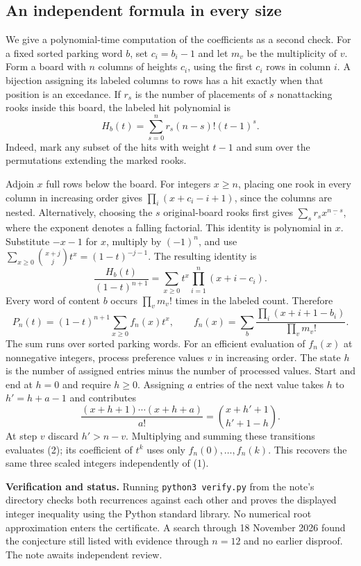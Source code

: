 \documentclass[11pt]{article}
\begin{document}
\subsection*{An independent formula in every size}
We give a polynomial-time computation of the coefficients as a second check. For a fixed sorted parking word $b$, set $c_i=b_i-1$ and let $m_v$ be the multiplicity of $v$. Form a board with $n$ columns of heights $c_i$, using the first $c_i$ rows in column $i$. A bijection assigning its labeled columns to rows has a hit exactly when that position is an excedance. If $r_s$ is the number of placements of $s$ nonattacking rooks inside this board, the labeled hit polynomial is
\[
 H_b(t)=\sum_{s=0}^n r_s(n-s)!(t-1)^s .
\]
Indeed, mark any subset of the hits with weight $t-1$ and sum over the permutations extending the marked rooks.

Adjoin $x$ full rows below the board. For integers $x\ge n$, placing one rook in every column in increasing order gives $\prod_i(x+c_i-i+1)$, since the columns are nested. Alternatively, choosing the $s$ original-board rooks first gives $\sum_s r_s x^{\underline{n-s}}$, where the exponent denotes a falling factorial. This identity is polynomial in $x$. Substitute $-x-1$ for $x$, multiply by $(-1)^n$, and use $\sum_{x\ge0}\binom{x+j}{j}t^x=(1-t)^{-j-1}$. The resulting identity is
\[
 \frac{H_b(t)}{(1-t)^{n+1}}=\sum_{x\ge0}t^x\prod_{i=1}^n(x+i-c_i).
\]
Every word of content $b$ occurs $\prod_v m_v!$ times in the labeled count. Therefore
\[
 P_n(t)=(1-t)^{n+1}\sum_{x\ge0}f_n(x)t^x,\qquad
 f_n(x)=\sum_{b}\frac{\prod_i(x+i+1-b_i)}{\prod_v m_v!}.
 \tag{2}
\]
The sum runs over sorted parking words. For an efficient evaluation of $f_n(x)$ at nonnegative integers, process preference values $v$ in increasing order. The state $h$ is the number of assigned entries minus the number of processed values. Start and end at $h=0$ and require $h\ge0$. Assigning $a$ entries of the next value takes $h$ to $h'=h+a-1$ and contributes
\[
 \frac{(x+h+1)\cdots(x+h+a)}{a!}=\binom{x+h'+1}{h'+1-h}.
\]
At step $v$ discard $h'>n-v$. Multiplying and summing these transitions evaluates (2); its coefficient of $t^k$ uses only $f_n(0),\ldots,f_n(k)$. This recovers the same three scaled integers independently of (1).

\small
\textbf{Verification and status.} Running \texttt{python3 verify.py} from the note's directory checks both recurrences against each other and proves the displayed integer inequality using the Python standard library. No numerical root approximation enters the certificate. A search through 18 November 2026 found the conjecture still listed with evidence through $n=12$ and no earlier disproof. The note awaits independent review.
\end{document}
